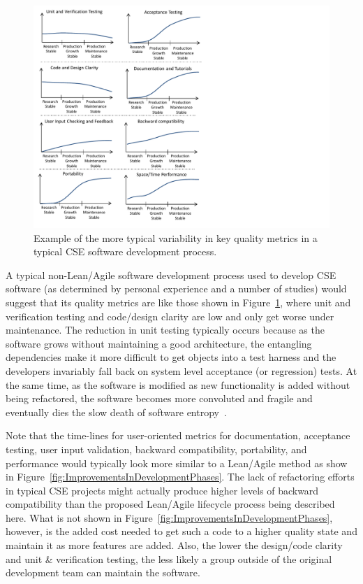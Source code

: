 \documentclass[11pt]{SANDreport}
\begin{document}
\begin{figure}
\begin{center}
\includegraphics[trim = 0.1in 0.1in 4.0in 0.1in, scale=0.85]
{TypicalNonAgileSoftwarePhases}
{}\caption{Example of the more typical variability in key quality
metrics in a typical CSE software development process.}
\label{fig:TypicalNonAgileSoftwarePhases}
\end{center}
\end{figure}

A typical non-Lean/Agile software development process used to develop
CSE software (as determined by personal experience and a number of
studies) would suggest that its quality metrics are like those shown
in Figure~\ref{fig:TypicalNonAgileSoftwarePhases}, where unit and
verification testing and code/design clarity are low and only get
worse under maintenance.  The reduction in unit testing typically
occurs because as the software grows without maintaining a good
architecture, the entangling dependencies make it more
difficult to get objects into a test harness and the developers
invariably fall back on system level acceptance (or regression) tests.
At the same time, as the software is modified as new functionality is
added without being refactored, the software becomes more convoluted
and fragile and eventually dies the slow death of software
entropy~\cite{MythicalManMonth95}.

Note that the time-lines for user-oriented metrics for documentation,
acceptance testing, user input validation, backward compatibility,
portability, and performance would typically look more similar to a
Lean/Agile method as show in
Figure~\ref{fig:ImprovementsInDevelopmentPhases}.  The lack of refactoring 
efforts in typical
CSE projects might actually produce higher
levels of backward compatibility than the proposed Lean/Agile
lifecycle process being described here.  What is not shown in
Figure~\ref{fig:ImprovementsInDevelopmentPhases}, however, is the
added cost needed to get such a code to a higher quality state and
maintain it as more features are added.  Also, the lower the
design/code clarity and unit \& verification testing, the less likely
a group outside of the original development team can maintain the
software.
\end{document}
